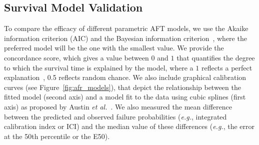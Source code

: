 






\subsection{Survival Model Validation}
\label{metrics}

To compare the efficacy of different parametric AFT models, we use the Akaike information criterion (AIC) and the Bayesian information criterion~\cite{stoica2004model,taddy2019business}, where the preferred model will be the one with the smallest value. We provide the
concordance score, which gives a value between $0$ and $1$ that quantifies the degree to which the survival time is explained by the model, where a $1$ reflects a perfect explanation~\cite{kleinbaum1996survival}, 0.5 reflects random chance. We also include graphical calibration curves (see Figure~\ref{fig:afr_models}), that depict the relationship between the fitted model (second axis) and a model fit to the data using cubic splines (first axis) as proposed by Austin \textit{et al.}~\cite{ici}. We also measured the mean difference between the predicted and observed failure probabilities (\textit{e.g.}, integrated calibration index or ICI) and the median value of these differences (\textit{e.g.}, the error at the 50th percentile or the E50). 


